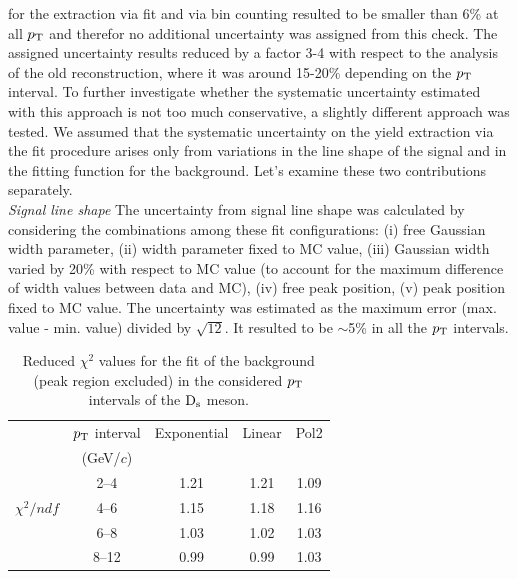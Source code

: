 for the extraction via fit and via bin counting resulted
to be smaller than 6\% at all $p_{\rm T}$ and therefor no additional uncertainty was assigned from this check. 
The assigned uncertainty results reduced by a factor 3-4 with respect to the analysis of the old reconstruction,
where it was around 15-20\% depending on the $p_{\rm T}$ interval. 
To further investigate whether the systematic uncertainty estimated with
this approach is not too much conservative, a slightly
different approach was tested. We assumed that 
the systematic uncertainty on the yield extraction via the fit procedure 
arises only from variations in the line shape of the signal and 
in the fitting function for the 
background. Let's examine these two contributions separately.\\

\emph{Signal line shape}
The uncertainty from signal line shape was calculated by 
considering the combinations among these fit
configurations: (i) free Gaussian width parameter, (ii) width parameter 
fixed to MC value, (iii) Gaussian width varied by 20\% with 
respect to MC value (to account for the maximum difference of width values between data and MC), 
(iv) free peak position, (v) peak position fixed to MC value.
The uncertainty was estimated as the maximum error (max. value - min. value) divided by $\sqrt{12}$.
It resulted to be $\sim$5\% in all the $p_{\rm T}$ intervals. 
\begin{table}[!t]
\centering
\vspace{0.5cm}
\begin{tabular}{|c|c|c|c|c|} 
\hline \rule{0pt}{2.7ex}
 & $p_{\rm T}$ interval & Exponential & Linear & Pol2 \\ 
 &(GeV/$c$) & & &  \\ 
\hline \rule{0pt}{2.7ex}
           &\phantom{0}2--4\phantom{0} & 1.21 & 1.21 & 1.09\\
           $\chi^2/ndf$ &\phantom{0}4--6\phantom{0} & 1.15 & 1.18 & 1.16\\
          &\phantom{0}6--8\phantom{0} & 1.03 & 1.02 & 1.03\\
           &\phantom{0}8--12 & 0.99 & 0.99  & 1.03\\
\hline
\end{tabular}
\caption{Reduced $\chi^2$ values for the fit of the background (peak region excluded) in the
considered $p_{\rm T}$ intervals of the ${\rm D_s}$ meson.} 
\label{tab:chi2bkg}
\end{table}

